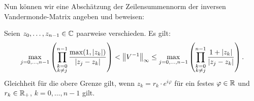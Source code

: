 Nun können wir eine Abschätzung der Zeilensummennorm der inversen
Vandermonde-Matrix angeben und beweisen:
\begin{theorem}
  \label{thm:inverse_vandermonde_inequality}
  Seien $z_0, \dots, z_{n-1} \in \mathbb{C}$ paarweise verschieden.
  Es gilt:
  \begin{equation}
    \label{eq:inverse_vandermonde_inequality}
    \max_{j = 0, \dots, n-1} \left( \prod_{\substack{k = 0\\ k \neq j}}^{n-1} \frac{\max(1, \left\lvert z_k \right\rvert)}{\left\lvert z_j - z_k \right\rvert} \right)
    < \left\lVert V^{-1} \right\rVert_{\infty}
    \leq \max_{j = 0, \dots, n-1} \left( \prod_{\substack{k = 0\\ k \neq j}}^{n-1} \frac{1 + \left\lvert z_k \right\rvert}{\left\lvert z_j - z_k \right\rvert} \right).
  \end{equation}
  Gleichheit für die obere Grenze gilt, wenn $z_k = r_k \cdot e^{i \varphi}$
  für ein festes $\varphi \in \mathbb{R}$ und $r_k \in \mathbb{R}_{+}$, $k = 0, \dots, n-1$ gilt.
\end{theorem}

